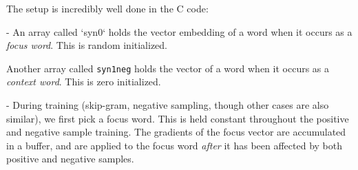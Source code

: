 \documentclass[11pt]{book}
\begin{document}
The setup is incredibly well done in the C code:

- An array called `syn0` holds the vector embedding of a word when it occurs
  as a \emph{focus word}. This is random initialized.


Another array called \texttt{syn1neg} holds the vector of a word when it occurs
as a \emph{context word}. This is zero initialized.


- During training (skip-gram, negative sampling, though other cases are
  also similar), we first pick a focus word. This is held constant throughout
  the positive and negative sample training. The gradients of the focus vector
  are accumulated in a buffer, and are applied to the focus word
  \emph{after} it has been affected by both positive and negative samples.
\end{document}
